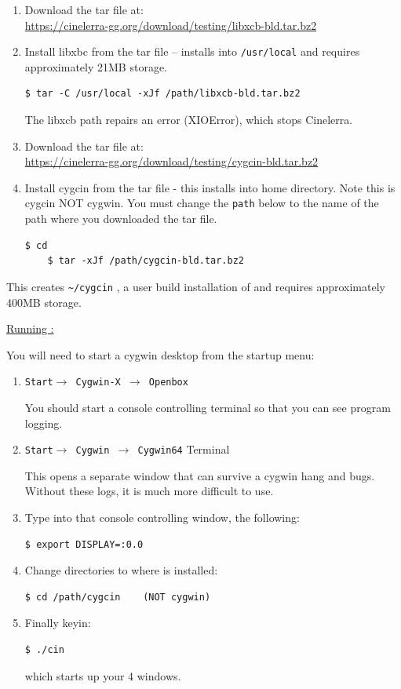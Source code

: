 \begin{enumerate}
	\item Download the tar file at:\\
	 {\small \url{https://cinelerra-gg.org/download/testing/libxcb-bld.tar.bz2}}
	\item Install libxbc from the tar file -- installs into \texttt{/usr/local} and requires approximately 21MB storage.
\begin{lstlisting}[numbers=none]
	$ tar -C /usr/local -xJf /path/libxcb-bld.tar.bz2
\end{lstlisting}
The libxcb path repairs an error (XIOError), which stops Cinelerra.
	\item Download the tar file at:\\
	{\small \url{https://cinelerra-gg.org/download/testing/cygcin-bld.tar.bz2}}	
	\item Install cygcin from the tar file - this installs into home directory.  Note this is cygcin NOT cygwin. You must change the \texttt{path} below to the name of the path where you downloaded the tar file.
\begin{lstlisting}[numbers=none]
	$ cd
	$ tar -xJf /path/cygcin-bld.tar.bz2
\end{lstlisting}
\end{enumerate}
This creates \texttt{\~{}/cygcin} , a user build installation of \CGG{} and requires approximately 400MB storage.

\underline{Running \CGG{}:}

You will need to start a cygwin desktop from the startup menu:
\begin{enumerate}
	\item \texttt{Start$\rightarrow$ Cygwin-X $\rightarrow$ Openbox}

You should start a console controlling terminal so that you can see program logging.
	\item \texttt{Start$\rightarrow$ Cygwin $\rightarrow$ Cygwin64} Terminal

This opens a separate window that can survive a cygwin hang and bugs. Without these logs, it is much more difficult to use.

	\item Type into that console controlling window, the following:
\begin{lstlisting}[language=bash,numbers=none]
	$ export DISPLAY=:0.0
\end{lstlisting}
	\item Change directories to where \CGG{} is installed:
\begin{lstlisting}[numbers=none]
	$ cd /path/cygcin    (NOT cygwin)
\end{lstlisting}
	\item Finally keyin:
\begin{lstlisting}[numbers=none]
	$ ./cin
\end{lstlisting}
which starts up your 4 \CGG{} windows.
\end{enumerate}

